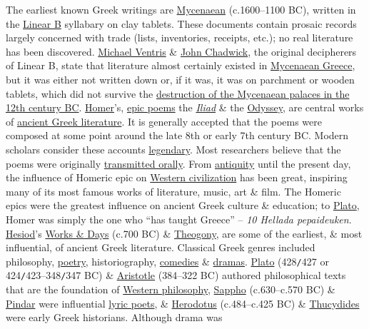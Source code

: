 \documentclass[oneside]{book}
\numberwithin{equation}{section}
\begin{document}
The earliest known Greek writings are \href{https://en.wikipedia.org/wiki/Mycenaean_language}{Mycenaean} (c.1600--1100 BC), written in the \href{https://en.wikipedia.org/wiki/Linear_B}{Linear B} syllabary on clay tablets. These documents contain prosaic records largely concerned with trade (lists, inventories, receipts, etc.); no real literature has been discovered. \href{https://en.wikipedia.org/wiki/Michael_Ventris}{Michael Ventris} \& \href{https://en.wikipedia.org/wiki/John_Chadwick}{John Chadwick}, the original decipherers of Linear B, state that literature almost certainly existed in \href{https://en.wikipedia.org/wiki/Mycenaean_Greece}{Mycenaean Greece}, but it was either not written down or, if it was, it was on parchment or wooden tablets, which did not survive the \href{https://en.wikipedia.org/wiki/Late_Bronze_Age_collapse#Greece}{destruction of the Mycenaean palaces in the 12th century BC}. \href{https://en.wikipedia.org/wiki/Homer}{Homer}'s, \href{https://en.wikipedia.org/wiki/Epic_poems}{epic poems} the \href{https://en.wikipedia.org/wiki/Iliad}{\textit{Iliad}} \& the \href{https://en.wikipedia.org/wiki/Odyssey}{Odyssey}, are central works of \href{https://en.wikipedia.org/wiki/Ancient_Greek_literature}{ancient Greek literature}. It is generally accepted that the poems were composed at some point around the late 8th or early 7th century BC. Modern scholars consider these accounts \href{https://en.wikipedia.org/wiki/Legend}{legendary}. Most researchers believe that the poems were originally \href{https://en.wikipedia.org/wiki/Oral_tradition}{transmitted orally}. From \href{https://en.wikipedia.org/wiki/Classical_antiquity}{antiquity} until the present day, the influence of Homeric epic on \href{https://en.wikipedia.org/wiki/Western_culture}{Western civilization} has been great, inspiring many of its most famous works of literature, music, art \& film. The Homeric epics were the greatest influence on ancient Greek culture \& education; to \href{https://en.wikipedia.org/wiki/Plato}{Plato}, Homer was simply the one who ``has taught Greece'' -- \textit{10 Hellada pepaideuken}. \href{https://en.wikipedia.org/wiki/Hesiod}{Hesiod}'s \href{https://en.wikipedia.org/wiki/Works_and_Days}{Works \& Days} (c.700 BC) \& \href{https://en.wikipedia.org/wiki/Theogony}{Theogony}, are some of the earliest, \& most influential, of ancient Greek literature. Classical Greek genres included philosophy, \href{https://en.wikipedia.org/wiki/Poetry}{poetry}, historiography, \href{https://en.wikipedia.org/wiki/Comedies}{comedies} \& \href{https://en.wikipedia.org/wiki/Drama}{dramas}. \href{https://en.wikipedia.org/wiki/Plato}{Plato} (428\texttt{/}427 or 424\texttt{/}423--348\texttt{/}347 BC) \& \href{https://en.wikipedia.org/wiki/Aristotle}{Aristotle} (384--322 BC) authored philosophical texts that are the foundation of \href{https://en.wikipedia.org/wiki/Western_philosophy}{Western philosophy}, \href{https://en.wikipedia.org/wiki/Sappho}{Sappho} (c.630--c.570 BC) \& \href{https://en.wikipedia.org/wiki/Pindar}{Pindar} were influential \href{https://en.wikipedia.org/wiki/Lyric_poetry}{lyric poets}, \& \href{https://en.wikipedia.org/wiki/Herodotus}{Herodotus} (c.484--c.425 BC) \& \href{https://en.wikipedia.org/wiki/Thucydides}{Thucydides} were early Greek historians. Although drama was 
\end{document}
